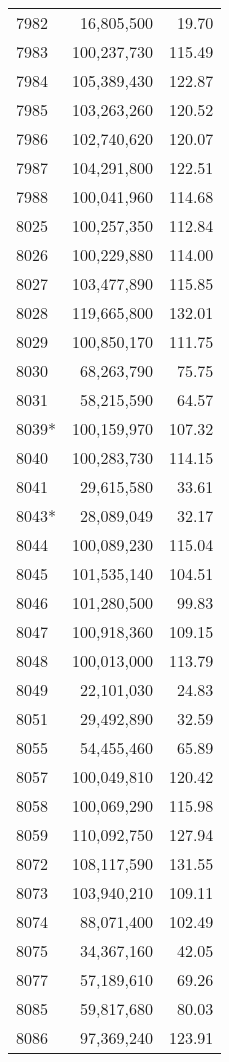 \documentclass[11pt]{article}
\begin{document}
\begin{longtable}[!hbtp]{l r r}
7982  &  16,805,500  &  19.70\\
7983  &  100,237,730  &  115.49\\
7984  &  105,389,430  &  122.87\\
7985  &  103,263,260  &  120.52\\
7986  &  102,740,620  &  120.07\\
7987  &  104,291,800  &  122.51\\
7988  &  100,041,960  &  114.68\\
8025  &  100,257,350  &  112.84\\
8026  &  100,229,880  &  114.00\\
8027  &  103,477,890  &  115.85\\
8028  &  119,665,800  &  132.01\\
8029  &  100,850,170  &  111.75\\
8030  &  68,263,790  &  75.75\\
8031  &  58,215,590  &  64.57\\
8039*  &  100,159,970  &  107.32\\
8040  &  100,283,730  &  114.15\\
8041  &  29,615,580  &  33.61\\
8043*  &  28,089,049  &  32.17\\
8044  &  100,089,230  &  115.04\\
8045  &  101,535,140  &  104.51\\
8046  &  101,280,500  &  99.83\\
8047  &  100,918,360  &  109.15\\
8048  &  100,013,000  &  113.79\\
8049  &  22,101,030  &  24.83\\
8051  &  29,492,890  &  32.59\\
8055  &  54,455,460  &  65.89\\
8057  &  100,049,810  &  120.42\\
8058  &  100,069,290  &  115.98\\
8059  &  110,092,750  &  127.94\\
8072  &  108,117,590  &  131.55\\
8073  &  103,940,210  &  109.11\\
8074  &  88,071,400  &  102.49\\
8075  &  34,367,160  &  42.05\\
8077  &  57,189,610  &  69.26\\
8085  &  59,817,680  &  80.03\\
8086  &  97,369,240  &  123.91\\

\end{longtable}
\end{document}
